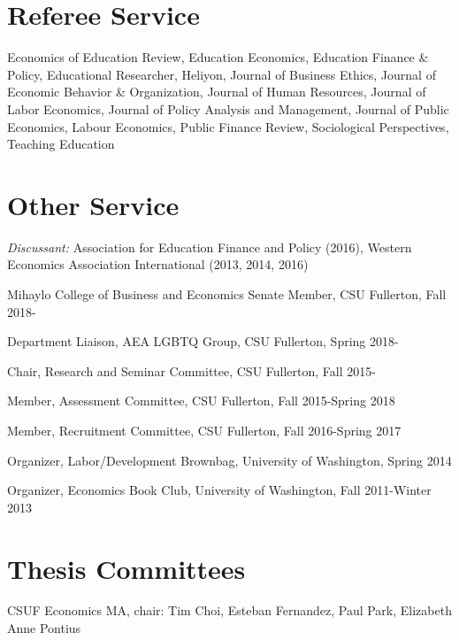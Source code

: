 \documentclass[11pt,a4paper,serif]{moderncv}
\begin{document}
\section{Referee Service}  
  
Economics of Education Review, Education Economics, Education Finance \& Policy, Educational Researcher, Heliyon, Journal of Business Ethics, Journal of Economic Behavior \& Organization, Journal of Human Resources, Journal of Labor Economics, Journal of Policy Analysis and Management, Journal of Public Economics, Labour Economics, Public Finance Review, Sociological Perspectives, Teaching Education



\section{Other Service}  
  
\emph{Discussant:} Association for Education Finance and Policy (2016), Western Economics Association International (2013, 2014, 2016)



Mihaylo College of Business and Economics Senate Member, CSU Fullerton, Fall 2018-



Department Liaison, AEA LGBTQ Group, CSU Fullerton, Spring 2018-



Chair, Research and Seminar Committee, CSU Fullerton, Fall 2015-



Member, Assessment Committee, CSU Fullerton, Fall 2015-Spring 2018



Member, Recruitment Committee, CSU Fullerton, Fall 2016-Spring 2017



Organizer, Labor/Development Brownbag, University of Washington, Spring 2014



Organizer, Economics Book Club, University of Washington, Fall 2011-Winter 2013



\section{Thesis Committees}  
  
CSUF Economics MA, chair: Tim Choi, Esteban Fernandez, Paul Park, Elizabeth Anne Pontius
\end{document}
